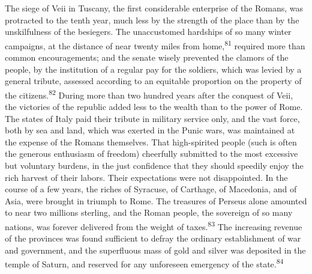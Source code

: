 The siege of Veii in Tuscany, the first considerable enterprise
of the Romans, was protracted to the tenth year, much less by the
strength of the place than by the unskilfulness of the besiegers.
The unaccustomed hardships of so many winter campaigns, at the
distance of near twenty miles from home,\textsuperscript{81} required more than
common encouragements; and the senate wisely prevented the
clamors of the people, by the institution of a regular pay for
the soldiers, which was levied by a general tribute, assessed
according to an equitable proportion on the property of the
citizens.\textsuperscript{82} During more than two hundred years after the
conquest of Veii, the victories of the republic added less to the
wealth than to the power of Rome. The states of Italy paid their
tribute in military service only, and the vast force, both by sea
and land, which was exerted in the Punic wars, was maintained at
the expense of the Romans themselves. That high-spirited people
(such is often the generous enthusiasm of freedom) cheerfully
submitted to the most excessive but voluntary burdens, in the
just confidence that they should speedily enjoy the rich harvest
of their labors. Their expectations were not disappointed. In the
course of a few years, the riches of Syracuse, of Carthage, of
Macedonia, and of Asia, were brought in triumph to Rome. The
treasures of Perseus alone amounted to near two millions
sterling, and the Roman people, the sovereign of so many nations,
was forever delivered from the weight of taxes.\textsuperscript{83} The increasing
revenue of the provinces was found sufficient to defray the
ordinary establishment of war and government, and the superfluous
mass of gold and silver was deposited in the temple of Saturn,
and reserved for any unforeseen emergency of the state.\textsuperscript{84}



